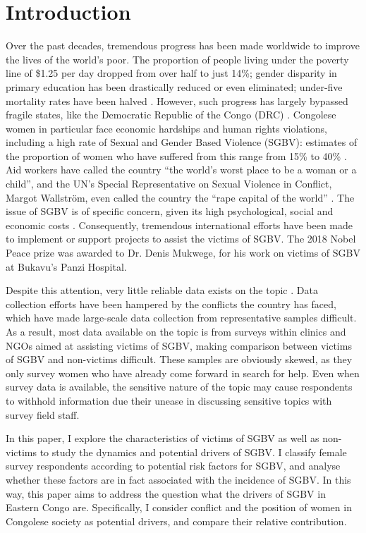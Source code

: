\section{Introduction}
Over the past decades, tremendous progress has been made worldwide to improve the lives of the world's poor. The proportion of people living under the poverty line of \$1.25 per day dropped from over half to just 14\%; gender disparity in primary education has been drastically reduced or even eliminated; under-five mortality rates have been halved \citep{UnitedNations2015}. However, such progress has largely bypassed fragile states, like the Democratic Republic of the Congo (DRC) \citep{Asadullah2018,Samy2011}. Congolese women in particular face economic hardships and human rights violations, including a high rate of Sexual and Gender Based Violence (SGBV): estimates of the proportion of women who have suffered from this range from 15\% to 40\% \citep{Johnson2010,Peterman2011}. Aid workers have called the country ``the world's worst place to be a woman or a child'', and the UN's Special Representative on Sexual Violence in Conflict, Margot Wallstr\"{o}m, even called the country the ``rape capital of the world'' \citep{HumanRightsWatch2009}. The issue of SGBV is of specific concern, given its high psychological, social and economic costs \citep{Post2002,Peterson2018}. Consequently, tremendous international efforts have been made to implement or support projects to assist the victims of SGBV. The 2018 Nobel Peace prize was awarded to Dr. Denis Mukwege, for his work on victims of SGBV at Bukavu's Panzi Hospital.

Despite this attention, very little reliable data exists on the topic \citep{Palermo2011}. Data collection efforts have been hampered by the conflicts the country has faced, which have made large-scale data collection from representative samples difficult. As a result, most data available on the topic is from surveys within clinics and NGOs aimed at assisting victims of SGBV, making comparison between victims of SGBV and non-victims difficult. These samples are obviously skewed, as they only survey women who have already come forward in search for help. Even when survey data is available, the sensitive nature of the topic may cause respondents to withhold information due their unease in discussing sensitive topics with survey field staff.


In this paper, I explore the characteristics of victims of SGBV as well as non-victims to study the dynamics and potential drivers of SGBV. I classify female survey respondents according to potential risk factors for SGBV, and analyse whether these factors are in fact associated with the incidence of SGBV. In this way, this paper aims to address the question what the drivers of SGBV in Eastern Congo are. Specifically, I consider conflict and the position of women in Congolese society as potential drivers, and compare their relative contribution.

